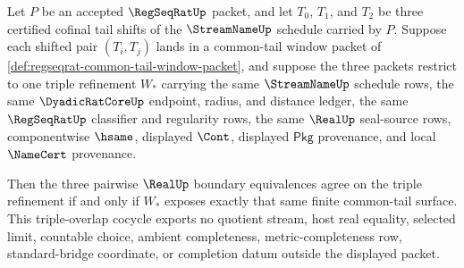 \begin{theorem}
\label{thm:regseqrat-common-tail-triple-overlap-cocycle}
Let $P$ be an accepted $\RegSeqRatUp$ packet, and let $T_0$, $T_1$, and $T_2$ be three certified cofinal tail shifts of the $\StreamNameUp$ schedule carried by $P$. Suppose each shifted pair $(T_i,T_j)$ lands in a common-tail window packet of \autoref{def:regseqrat-common-tail-window-packet}, and suppose the three packets restrict to one triple refinement $W_\ast$ carrying the same $\StreamNameUp$ schedule rows, the same $\DyadicRatCoreUp$ endpoint, radius, and distance ledger, the same $\RegSeqRatUp$ classifier and regularity rows, the same $\RealUp$ seal-source rows, componentwise $\hsame$, displayed $\Cont$, displayed $\mathsf{Pkg}$ provenance, and local $\NameCert$ provenance.

Then the three pairwise $\RealUp$ boundary equivalences agree on the triple refinement if and only if $W_\ast$ exposes exactly that same finite common-tail surface. This triple-overlap cocycle exports no quotient stream, host real equality, selected limit, countable choice, ambient completeness, metric-completeness row, standard-bridge coordinate, or completion datum outside the displayed packet.
\end{theorem}
